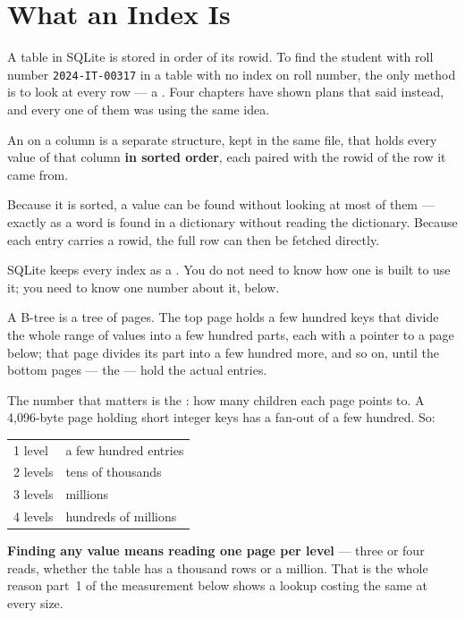 \section{What an Index Is}

A table in SQLite is stored in order of its rowid. To find the student with
roll number \texttt{2024-IT-00317} in a table with no index on roll number,
the only method is to look at every row --- a . Four chapters have
shown plans that said  instead, and every one of them was using
the same idea.

\begin{definitionbox}[Index]
An  on a column is a separate structure, kept in the same file,
that holds every value of that column \textbf{in sorted order}, each paired
with the rowid of the row it came from.

\smallskip
Because it is sorted, a value can be found without looking at most of them ---
exactly as a word is found in a dictionary without reading the dictionary.
Because each entry carries a rowid, the full row can then be fetched directly.

\smallskip
SQLite keeps every index as a . You do not need to know how one is
built to use it; you need to know one number about it, below.
\end{definitionbox}

\begin{conceptbox}
A B-tree is a tree of pages. The top page holds a few hundred keys that divide
the whole range of values into a few hundred parts, each with a pointer to a
page below; that page divides its part into a few hundred more, and so on,
until the bottom pages --- the  --- hold the actual entries.

\smallskip
The number that matters is the : how many children each page
points to. A 4{,}096-byte page holding short integer keys has a fan-out of a
few hundred. So:

\begin{tabular}{@{}L{3.6cm}L{10.2cm}@{}}
1 level   & a few hundred entries \\
2 levels  & tens of thousands \\
3 levels  & millions \\
4 levels  & hundreds of millions \\
\end{tabular}

\smallskip
\textbf{Finding any value means reading one page per level} --- three or four
reads, whether the table has a thousand rows or a million. That is the whole
reason part~1 of the measurement below shows a lookup costing the same at every
size.
\end{conceptbox}

